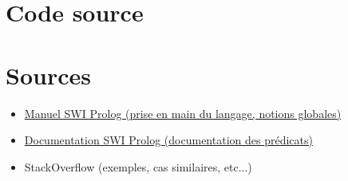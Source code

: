 \documentclass[12pt]{article} %
\begin{document}
\newpage

\section*{Code source}



\newpage

\section*{Sources}

\begin{itemize}
	\item \href{http://lpn.swi-prolog.org/lpnpage.php?pageid=online}{Manuel SWI Prolog (prise en main du langage, notions globales)}
	\item \href{http://www.swi-prolog.org/pldoc/doc_for?object=root}{Documentation SWI Prolog (documentation des prédicats)}
	\item StackOverflow (exemples, cas similaires, etc...)
\end{itemize}
\end{document}
